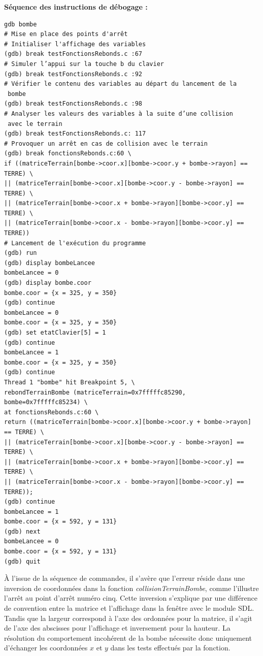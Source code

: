 \documentclass[11pt,a4paper]{article}
\begin{document}
\textbf{Séquence des instructions de débogage :}
\begin{verbatim}
gdb bombe
# Mise en place des points d'arrêt
# Initialiser l'affichage des variables
(gdb) break testFonctionsRebonds.c :67
# Simuler l’appui sur la touche b du clavier 
(gdb) break testFonctionsRebonds.c :92
# Vérifier le contenu des variables au départ du lancement de la
 bombe
(gdb) break testFonctionsRebonds.c :98
# Analyser les valeurs des variables à la suite d’une collision
 avec le terrain
(gdb) break testFonctionsRebonds.c: 117
# Provoquer un arrêt en cas de collision avec le terrain
(gdb) break fonctionsRebonds.c:60 \
if ((matriceTerrain[bombe->coor.x][bombe->coor.y + bombe->rayon] == TERRE) \
|| (matriceTerrain[bombe->coor.x][bombe->coor.y - bombe->rayon] == TERRE) \
|| (matriceTerrain[bombe->coor.x + bombe->rayon][bombe->coor.y] == TERRE) \
|| (matriceTerrain[bombe->coor.x - bombe->rayon][bombe->coor.y] == TERRE))
# Lancement de l'exécution du programme
(gdb) run
(gdb) display bombeLancee
bombeLancee = 0
(gdb) display bombe.coor
bombe.coor = {x = 325, y = 350}
(gdb) continue
bombeLancee = 0
bombe.coor = {x = 325, y = 350}
(gdb) set etatClavier[5] = 1
(gdb) continue
bombeLancee = 1
bombe.coor = {x = 325, y = 350}
(gdb) continue
Thread 1 "bombe" hit Breakpoint 5, \
rebondTerrainBombe (matriceTerrain=0x7fffffc85290, bombe=0x7fffffc85234) \
at fonctionsRebonds.c:60 \
return ((matriceTerrain[bombe->coor.x][bombe->coor.y + bombe->rayon] == TERRE) \
|| (matriceTerrain[bombe->coor.x][bombe->coor.y - bombe->rayon] == TERRE) \
|| (matriceTerrain[bombe->coor.x + bombe->rayon][bombe->coor.y] == TERRE) \
|| (matriceTerrain[bombe->coor.x - bombe->rayon][bombe->coor.y] == TERRE));
(gdb) continue
bombeLancee = 1
bombe.coor = {x = 592, y = 131}
(gdb) next
bombeLancee = 0
bombe.coor = {x = 592, y = 131}
(gdb) quit
\end{verbatim}
À l'issue de la séquence de commandes, il s'avère que l'erreur réside dans une inversion de coordonnées dans la fonction \textit{\mbox{collisionTerrainBombe}}, comme l'illustre l'arrêt au point d'arrêt numéro cinq. Cette inversion s'explique par une différence de convention entre la matrice et l'affichage dans la fenêtre avec le module SDL. Tandis que la largeur correspond à l'axe des ordonnées pour la matrice, il s'agit de l'axe des abscisses pour l'affichage et inversement pour la hauteur. La résolution du comportement incohérent de la bombe nécessite donc uniquement d'échanger les coordonnées $x$ et $y$ dans les tests effectués par la fonction.

\newpage
\end{document}
